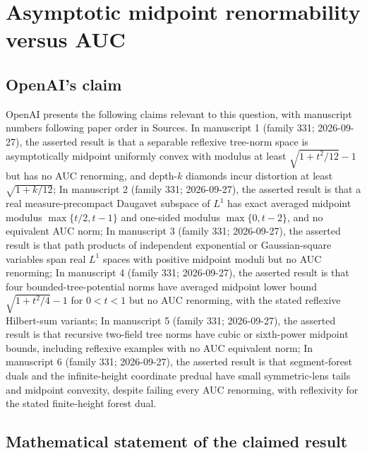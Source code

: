 \documentclass[11pt]{article}
\begin{document}
\section*{Asymptotic midpoint renormability versus AUC}

\subsection{OpenAI's claim}
OpenAI presents the following claims relevant to this question, with manuscript numbers following paper order in Sources. In manuscript 1 (family 331; 2026-09-27), the asserted result is that a separable reflexive tree-norm space is asymptotically midpoint uniformly convex with modulus at least $\sqrt{1+t^2/12}-1$ but has no AUC renorming, and depth-$k$ diamonds incur distortion at least $\sqrt{1+k/12}$; In manuscript 2 (family 331; 2026-09-27), the asserted result is that a real measure-precompact Daugavet subspace of $L^1$ has exact averaged midpoint modulus $\max\{t/2,t-1\}$ and one-sided modulus $\max\{0,t-2\}$, and no equivalent AUC norm; In manuscript 3 (family 331; 2026-09-27), the asserted result is that path products of independent exponential or Gaussian-square variables span real $L^1$ spaces with positive midpoint moduli but no AUC renorming; In manuscript 4 (family 331; 2026-09-27), the asserted result is that four bounded-tree-potential norms have averaged midpoint lower bound $\sqrt{1+t^2/4}-1$ for $0<t<1$ but no AUC renorming, with the stated reflexive Hilbert-sum variants; In manuscript 5 (family 331; 2026-09-27), the asserted result is that recursive two-field tree norms have cubic or sixth-power midpoint bounds, including reflexive examples with no AUC equivalent norm; In manuscript 6 (family 331; 2026-09-27), the asserted result is that segment-forest duals and the infinite-height coordinate predual have small symmetric-lens tails and midpoint convexity, despite failing every AUC renorming, with reflexivity for the stated finite-height forest dual.

\subsection{Mathematical statement of the claimed result}
\end{document}
